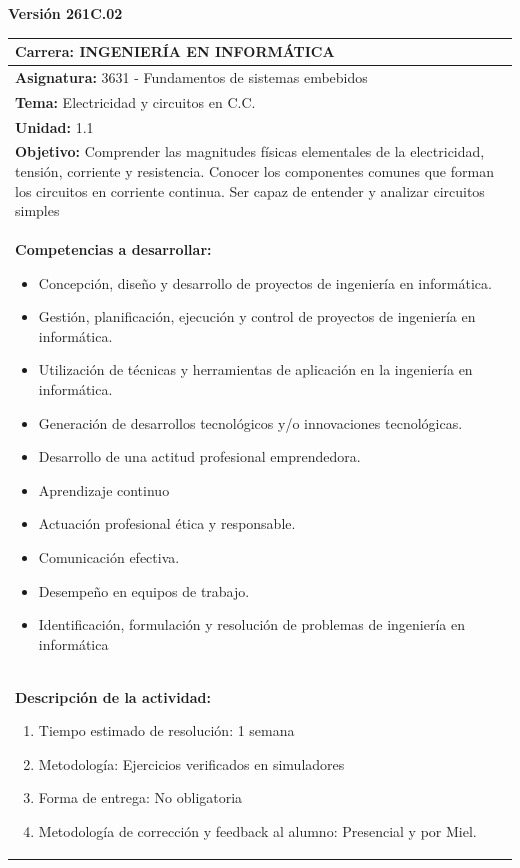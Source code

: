 \documentclass{article}
\newcommand{\Version}{Versión 261C.02}
\newcommand{\Carrera}{INGENIERÍA EN INFORMÁTICA}
\newcommand{\Asignatura}{3631 - Fundamentos de sistemas embebidos}
\newcommand{\Tema}{Electricidad y circuitos en C.C.}
\newcommand{\Unidad}{1.1}
\newcommand{\Objetivo}{Comprender las magnitudes físicas elementales de la electricidad, tensión, corriente y resistencia. Conocer los componentes comunes que forman los circuitos en corriente continua. Ser capaz de entender y analizar circuitos simples}
\newcommand{\TiempoResolucion}{1 semana}
\newcommand{\Metodologia}{Ejercicios verificados en simuladores}
\newcommand{\Entrega}{No obligatoria}
\begin{document}
	
		\centering\LARGE{\textbf{\Version}}
	\large
	\\
	\begin{center}
		\begin{tabular}{|p{16cm}|} %
			
			\hline
			\rule{0pt}{15pt}
			\textbf{Carrera: \Carrera} \\
			\hline
			\rule{0pt}{15pt}
			\textbf{Asignatura:}  \Asignatura \\
			\hline
			\rule{0pt}{15pt}
			\textbf{Tema:}  \Tema \\
			\hline
			\rule{0pt}{15pt}
			\textbf{Unidad:}  \Unidad \\
			\hline
			\rule{0pt}{15pt}
			\textbf{Objetivo:} \Objetivo \\
			\hline
			\rule{0pt}{15pt}
			\textbf{Competencias a desarrollar:} 
			\begin{itemize}
				\item Concepción, diseño y desarrollo de proyectos de ingeniería en informática.
				\item Gestión, planificación, ejecución y control de proyectos de ingeniería en informática.
				\item Utilización de técnicas y herramientas de aplicación en la ingeniería en informática.
				\item Generación de desarrollos tecnológicos y/o innovaciones tecnológicas.
				\item Desarrollo de una actitud profesional emprendedora.
				\item Aprendizaje continuo
				\item Actuación profesional ética y responsable.
				\item Comunicación efectiva.
				\item Desempeño en equipos de trabajo.
				\item Identificación, formulación y resolución de problemas de ingeniería en informática
			\end{itemize} \\
			\hline
			\rule{0pt}{15pt}
			\textbf{Descripción de la actividad:} 
			\begin{enumerate}
				\item  Tiempo estimado de resolución: \TiempoResolucion
				\item Metodología: \Metodologia
				\item Forma de entrega: \Entrega
				\item Metodología de corrección y feedback al alumno: Presencial y por Miel.
			\end{enumerate} \\
			\hline
		\end{tabular}
	\end{center}
	
\end{document}
